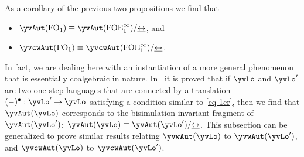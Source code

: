 \begin{remark}{\rm
As a corollary of the previous two propositions we find that 
\begin{itemize}
	 pt
	\item $\yvAut(\ofo) \equiv \yvAut(\olque)/{\bis}$, and
	\item $\yvcwAut(\ofo) \equiv \yvcwAut(\olque)/{\bis}$.
\end{itemize}
In fact, we are dealing here with an instantiation of a more general phenomenon 
that is essentially coalgebraic in nature.
In~\cite{Venxx} it is proved that if $\yvLo$ and $\yvLo'$ are two one-step
languages that are connected by a translation $(-)^{\bullet}: \yvLo' \to 
\yvLo$ satisfying a condition similar to \eqref{eq-1cr}, then we find that 
$\yvAut(\yvLo)$ corresponds to the bisimulation-invariant fragment of 
$\yvAut(\yvLo')$: $\yvAut(\yvLo) \equiv \yvAut(\yvLo')/{\bis}$.
This subsection can be generalized to prove similar results relating
$\yvwAut(\yvLo)$ to $\yvwAut(\yvLo')$, and $\yvcwAut(\yvLo)$ to 
$\yvcwAut(\yvLo')$.
}\end{remark}
